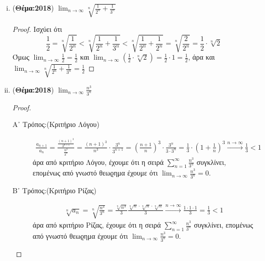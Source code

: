 \begin{enumerate}
\begin{enumerate}[i)]
        \item ({\bfseries Θέμα:2018}) $ \lim_{n \to \infty} 
          \sqrt[n]{\frac{1}{2^{n}}+ \frac{1}{3^{n}}} $ 
          \begin{proof}
            Ισχύει ότι 
            \[
              \frac{1}{2} = \sqrt[n]{\frac{1}{2^{n}}} < 
              \sqrt[n]{\frac{1}{2^{n}} + \frac{1}{3^{n}} } < 
              \sqrt[n]{\frac{1}{2^{n}} + \frac{1}{2^{n}}} = 
              \sqrt[n]{\frac{2}{2^{n}}} = \frac{1}{2} \cdot \sqrt[n]{2} 
            \] 
            Όμως $ \lim_{n \to \infty} \frac{1}{2} = \frac{1}{2} $ και 
            $ \lim_{n \to \infty} \left(\frac{1}{2} \cdot \sqrt[n]{2}\right) = 
            \frac{1}{2} \cdot 1 = \frac{1}{2} $, άρα και 
            $ \lim_{n \to \infty} \sqrt[n]{\frac{1}{2^{n}} + \frac{1}{3^{n}}} = 
            \frac{1}{2}  $
          \end{proof}

        \item ({\bfseries Θέμα:2018}) $ \lim_{n \to \infty} \frac{n^{3}}{3^{n}} $ 
          \begin{proof}
            \begin{description}
              \item [Α᾽ Τρόπος:(Κριτήριο Λόγου)]
                \begin{align*}
                  \frac{a_{n+1}}{a_{n}} = 
                  \frac{\frac{(n+1)^{3}}{3^{n+1}}}{\frac{n^{3}}{3^{n}}} = 
                  \frac{(n+1)^{3}}{n^{3}} \cdot \frac{3^{n}}{3^{n+1}} = 
                  \left(\frac{n+1}{n} \right)^{3} \cdot \frac{3^{n}}{3\cdot 3^{n}} = 
                  \frac{1}{3} \cdot \left(1 + \frac{1}{n}\right)^{3} 
                  \xrightarrow{n \to \infty} \frac{1}{3} < 1
                \end{align*}
                άρα από κριτήριο Λόγου, έχουμε ότι η σειρά 
                $ \sum_{n=1}^{\infty} \frac{n^{3}}{3^{n}} $ συγκλίνει, επομένως 
                από γνωστό θεωϱημα έχουμε ότι $ \lim_{n \to \infty} 
                \frac{n^{3}}{3^{n}} = 0 $.

              \item [Β᾽ Τρόπος:(Κριτήριο Ρίζας)]
                \begin{align*}
                  \sqrt[n]{a_{n}} = \sqrt[n]{\frac{n^{3}}{3^{n}}} = 
                  \frac{\sqrt[n]{n^{3}}}{3} \frac{\sqrt[n]{n} 
                    \cdot \sqrt[n]{n} \cdot \sqrt[n]{n}
                  }{3} \xrightarrow{n \to \infty} \frac{1 \cdot 1 \cdot 1}{3} = 
                  \frac{1}{3} < 1
                \end{align*}
                άρα από κριτήριο Ρίζας, έχουμε ότι η σειρά 
                $ \sum_{n=1}^{\infty} \frac{n^{3}}{3^{n}} $ συγκλίνει, επομένως 
                από γνωστό θεωϱημα έχουμε ότι $ \lim_{n \to \infty} 
                \frac{n^{3}}{3^{n}} = 0 $.


\end{description}
\end{proof}
\end{enumerate}
\end{enumerate}

